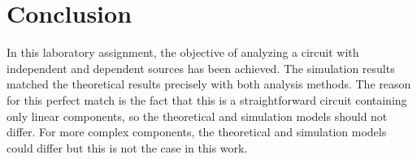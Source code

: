 \clearpage
\section{Conclusion}
\label{sec:conclusion}

In this laboratory assignment, the objective of analyzing a circuit with independent and
dependent sources has been
achieved. The simulation results matched the theoretical results
precisely with both analysis methods. The reason for this perfect match is the fact that this is a
straightforward circuit containing only linear components, so the theoretical
and simulation models should not differ. For more complex components, the
theoretical and simulation models could differ but this is not the case in this
work.
